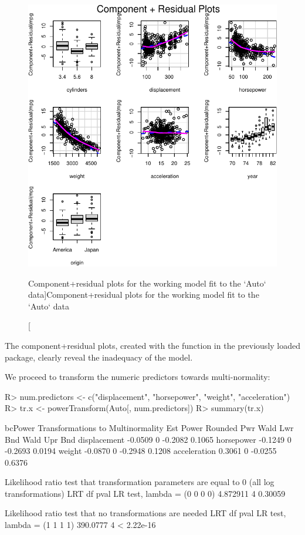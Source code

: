 \documentclass[
]{jss}
\begin{document}
\begin{CodeChunk}
\begin{figure}
{\centering \includegraphics[width=0.6\linewidth]{JSS-article-reduced_files/figure-latex/Auto-working-model-1} 

}

\caption[Component+residual plots for the working model fit to the `Auto` data]{Component+residual plots for the working model fit to the `Auto` data}\label{fig:Auto-working-model}
\end{figure}
\end{CodeChunk}

The component+residual plots, created with the  function
in the previously loaded  package, clearly reveal the
inadequacy of the model.

We proceed to transform the numeric predictors towards multi-normality:

\begin{CodeChunk}
\begin{CodeInput}
R> num.predictors <- c("displacement", "horsepower", "weight", "acceleration")
R> tr.x <- powerTransform(Auto[, num.predictors])
R> summary(tr.x)
\end{CodeInput}
\begin{CodeOutput}
bcPower Transformations to Multinormality 
             Est Power Rounded Pwr Wald Lwr Bnd Wald Upr Bnd
displacement   -0.0509           0      -0.2082       0.1065
horsepower     -0.1249           0      -0.2693       0.0194
weight         -0.0870           0      -0.2948       0.1208
acceleration    0.3061           0      -0.0255       0.6376

Likelihood ratio test that transformation parameters are equal to 0
 (all log transformations)
                                 LRT df    pval
LR test, lambda = (0 0 0 0) 4.872911  4 0.30059

Likelihood ratio test that no transformations are needed
                                 LRT df       pval
LR test, lambda = (1 1 1 1) 390.0777  4 < 2.22e-16
\end{CodeOutput}
\end{CodeChunk}
\end{document}
